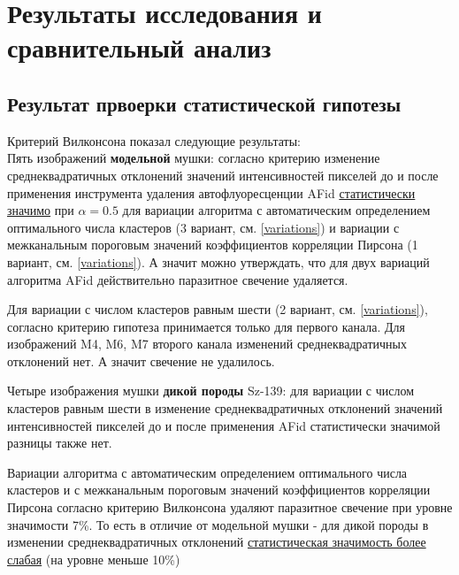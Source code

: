 \chapter{Результаты исследования и сравнительный анализ} \label{ch4}




	
\section{Результат првоерки статистической гипотезы} \label{ch4:sec1}
Критерий Вилконсона показал следующие результаты:\\

Пять изображений \textbf{модельной} мушки: согласно критерию изменение среднеквадратичных отклонений значений интенсивностей пикселей до и после применения инструмента удаления автофлуоресценции AFid \underline{статистически значимо} при $\alpha = 0.5$ для вариации алгоритма с автоматическим определением оптимального числа кластеров (3 вариант, см. \ref{variations}) и вариации с межканальным пороговым значений коэффициентов корреляции Пирсона (1 вариант, см. \ref{variations}). А значит можно утверждать, что для двух вариаций алгоритма AFid действительно паразитное свечение удаляется.

Для вариации с числом кластеров равным шести (2 вариант, см. \ref{variations}), согласно критерию гипотеза принимается только для первого канала. Для изображений M4, M6, M7 второго канала изменений среднеквадратичных отклонений нет. А значит свечение не удалилось.


Четыре изображения мушки \textbf{дикой породы} Sz-139: для вариации с числом кластеров равным шести в изменение среднеквадратичных отклонений значений интенсивностей пикселей до и после применения AFid статистически значимой разницы также нет.

Вариации алгоритма с автоматическим определением оптимального числа кластеров и с межканальным пороговым значений коэффициентов корреляции Пирсона согласно критерию Вилконсона удаляют паразитное свечение при уровне значимости 7\%. То есть в отличие от модельной мушки - для дикой породы в изменении среднеквадратичных отклонений \underline{статистическая значимость более слабая} (на уровне меньше 10\%) 

